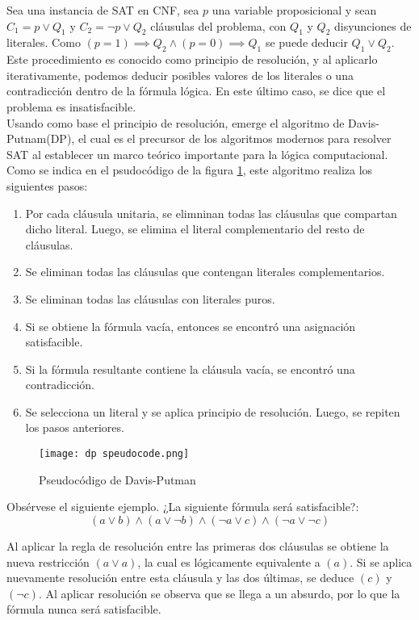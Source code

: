 \documentclass[12pt]{report}
\begin{document}
Sea una instancia de SAT en CNF, sea $p$ una variable proposicional y sean $C_1=p \lor  Q_1$  y  $C_2 = \neg p \lor  Q_2$ cláusulas del problema, con $Q_1$ y $Q_2$ disyunciones de literales. Como $(p=1)\implies  Q_2 \land (p=0)\implies  Q_1$ se puede deducir $Q_1\lor  Q_2$. Este procedimiento es conocido como principio de resolución, y al aplicarlo iterativamente, podemos deducir posibles valores de los literales o una contradicción dentro de la fórmula lógica. En este último caso, se dice que el problema es insatisfacible.\\ 

Usando como base el principio de resolución, emerge el algoritmo de Davis-Putnam(DP), el cual es el precursor de los algoritmos modernos para resolver SAT al establecer  un marco teórico importante para la lógica computacional. Como se indica en el psudocódigo de la figura \ref{fig:dp}, este algoritmo realiza los siguientes pasos:
\begin{enumerate}
    \item Por cada cláusula  unitaria, se elimninan todas las cláusulas que compartan dicho literal. Luego, se elimina el literal complementario del resto de cláusulas.
    \item Se eliminan todas las cláusulas que contengan literales complementarios.
    \item Se eliminan todas las cláusulas con literales puros.
    \item Si se obtiene la fórmula vacía, entonces se encontró una asignación satisfacible. 
    \item Si la fórmula resultante contiene la cláusula vacía, se encontró una contradicción.
    \item Se selecciona un literal y se aplica principio de resolución. Luego, se repiten los pasos anteriores.
\end{enumerate}

\begin{figure}[ht]
    \centering
    \texttt{[image: dp speudocode.png]}
    \caption{Pseudocódigo de Davis-Putman}
    \label{fig:dp}
\end{figure}


Obsérvese el siguiente ejemplo. ¿La siguiente fórmula será satisfacible?:
$$(a\lor  b) \land(a\lor  \neg b) \land (\neg a\lor  c) \land(\neg a\lor  \neg c)$$

Al aplicar la regla de resolución entre las primeras dos cláusulas se obtiene la nueva restricción $(a \lor  a)$, la cual es lógicamente equivalente a $(a)$. Si se aplica nuevamente resolución entre esta cláusula y las dos últimas, se deduce $(c)$ y $(\neg c)$. Al aplicar resolución se observa que se llega a un absurdo, por lo que la fórmula nunca será satisfacible. \\
\end{document}
